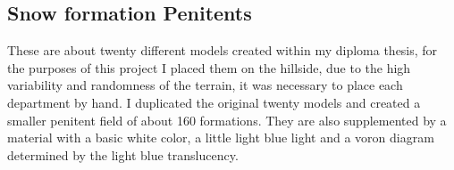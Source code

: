 \documentclass[12pt,a4paper,titlepage,final,tikz,border=4mm]{report}
\begin{document}
\subsection{Snow formation Penitents}
These are about twenty different models created within my diploma thesis, for the purposes of this project I placed them on the hillside, due to the high variability and randomness of the terrain, it was necessary to place each department by hand. I duplicated the original twenty models and created a smaller penitent field of about 160 formations. They are also supplemented by a material with a basic white color, a little light blue light and a voron diagram determined by the light blue translucency.
\end{document}
